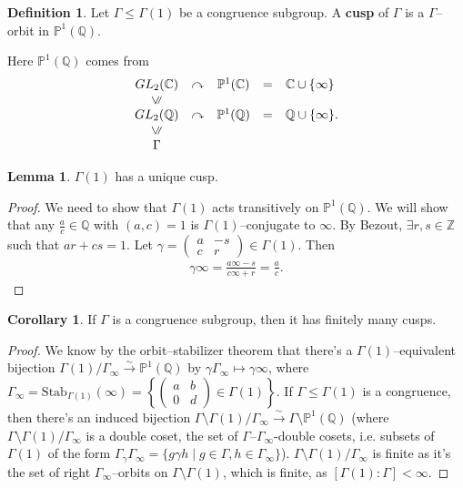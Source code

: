 \documentclass{article}
\theoremstyle{definition}
\newtheorem{lemma}[theorem]{Lemma}
\newtheorem{cor}[theorem]{Corollary}
\newtheorem{defn}{Definition}[section]
\begin{document}
\begin{defn}
    Let $\Gamma\le \Gamma(1)$ be a congruence subgroup. A \textbf{cusp} of $\Gamma$ is a $\Gamma$--orbit in $\mathbb{P}^1(\mathbb{Q})$.
\end{defn}
Here $\mathbb{P}^1(\mathbb{Q})$ comes from 
$$\begin{matrix} GL_2(\mathbb{C}) & \curvearrowright & \mathbb{P}^1(\mathbb{C}) & = & \mathbb{C} \cup \{\infty\} \\ \rotatebox[origin=c]{90}{$\leqslant $} & & &\\ GL_2(\mathbb{\mathbb{Q}}) & \curvearrowright & \mathbb{P}^1(\mathbb{\mathbb{Q}}) & = & \mathbb{Q} \cup \{\infty\} \\ \rotatebox[origin=c]{90}{$\leqslant $} & & & \\ \Gamma \end{matrix}.$$

\begin{lemma}
    $\Gamma(1)$ has a unique cusp.
\end{lemma}
\begin{proof}
    We need to show that $\Gamma(1)$ acts transitively on $\mathbb{P}^1(\mathbb{Q})$. We will show that any $\frac{a}{c} \in \mathbb{Q}$ with $(a,c)=1$ is $\Gamma(1)$--conjugate to $\infty$. By Bezout, $\exists r,s \in \mathbb{Z}$ such that $ar+cs=1$. Let $\gamma = \begin{pmatrix} a & -s \\ c & r \end{pmatrix} \in \Gamma(1)$. Then \begin{align*}
        \gamma \infty  = \frac{a \infty - s}{c \infty + r} = \frac{a}{c}.
    \end{align*}
\end{proof}

\begin{cor}
    If $\Gamma$ is a congruence subgroup, then it has finitely many cusps.
\end{cor}
\begin{proof}
    We know by the orbit--stabilizer theorem that there's a $\Gamma(1)$--equivalent bijection $\Gamma(1)/\Gamma_{\infty} \stackrel{\sim}{\to} \mathbb{P}^1(\mathbb{Q})$ by $\gamma \Gamma_{\infty} \mapsto \gamma \infty$, where $\Gamma_{\infty} = \text{Stab}_{\Gamma(1)}(\infty)= \left\{\begin{pmatrix} a&b\\0&d \end{pmatrix} \in \Gamma(1)\right\}$. If $\Gamma \le \Gamma(1)$ is a congruence, then there's an induced bijection $\Gamma\setminus  \Gamma(1) /\Gamma_{\infty} \stackrel{\sim}{\to} \Gamma \setminus \mathbb{P}^1(\mathbb{Q})$ (where $\Gamma\setminus  \Gamma(1) /\Gamma_{\infty}$ is a double coset, the set of $\Gamma$--$\Gamma_{\infty}$-double cosets, i.e. subsets of $\Gamma(1)$ of the form $\Gamma_{\gamma} \Gamma_{\infty} = \{g \gamma h \mid g \in \Gamma, h \in \Gamma_{\infty}\}$). $\Gamma\setminus  \Gamma(1) /\Gamma_{\infty}$ is finite as it's the set of right $\Gamma_{\infty}$--orbits on $\Gamma\setminus \Gamma(1)$, which is finite, as $[\Gamma(1):\Gamma]<\infty$.
\end{proof}
\end{document}

